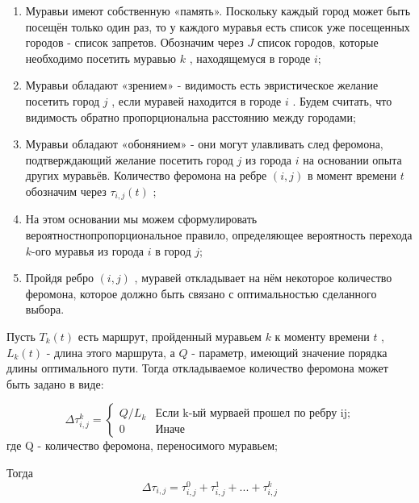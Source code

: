\documentclass[a4paper,12pt]{report}
\begin{document}
   			\begin{enumerate}
   			\item Муравьи имеют собственную «память». Поскольку каждый город может быть посещён только один раз, то у каждого муравья есть список уже посещенных городов - список запретов. Обозначим через $J$ список городов, которые необходимо посетить муравью $k$ , находящемуся в городе $i$;
   			
   			\item Муравьи обладают «зрением» - видимость есть эвристическое желание посетить город $j$ , если муравей находится в городе $i$ . Будем считать, что видимость обратно пропорциональна расстоянию между городами; 
   			
   			\item Муравьи обладают «обонянием» - они могут улавливать след феромона, подтверждающий желание посетить город $j$ из города $i$ на основании опыта других муравьёв. Количество феромона на ребре $(i,j)$ в момент времени $t$ обозначим через  $\tau _{i,j} (t)$ ;
   			
   			\item На этом основании мы можем сформулировать вероятностнопропорциональное правило, определяющее вероятность перехода $k$-ого муравья из города $i$  в город $j$;
   			
   			\item Пройдя ребро $(i,j)$ , муравей откладывает на нём некоторое количество феромона, которое должно быть связано с оптимальностью сделанного выбора.
   			\end{enumerate}
   			
   			Пусть $T _{k} (t)$ есть маршрут, пройденный муравьем $k$ к моменту времени $t$ , $L _{k} (t)$ - длина этого маршрута, а $Q$ - параметр, имеющий значение порядка длины оптимального пути. Тогда откладываемое количество феромона может быть задано в виде:
   			
   			\begin{equation}\label{form:add} 
   			{\displaystyle \Delta \tau _{i,j}^k={\begin{cases}Q/L_{k}& {\mbox{Если k-ый мурваей прошел по ребру ij;}}\\0&{\mbox{Иначе}}\end{cases}}}
   			\end{equation}
   			где \quad Q - количество феромона, переносимого муравьем;
   			
   			Тогда
   			\begin{equation}\label{form:add1} 
   			\Delta \tau _{i,j}= \tau _{i,j}^0 + \tau _{i,j}^1 + ... + \tau _{i,j}^k 
   			\end{equation}
   			
\end{document}
